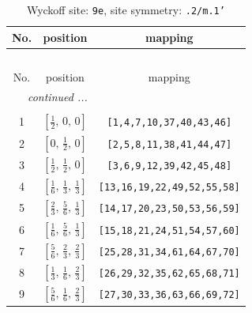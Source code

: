 \documentclass[fleqn,8pt]{jsarticle}
\begin{document}
\begin{longtable}{ccc}
\caption{Wyckoff site: {\tt 9e}, site symmetry: {\tt .2/m.1'}}
 \\
 \hline \hline
No. & position & mapping \\ \hline \endfirsthead

\multicolumn{2}{l}{\tablename\ \thetable{}} \\
 \hline \hline
No. & position & mapping \\ \hline \endhead

 \hline \hline
\multicolumn{2}{r}{\footnotesize\it continued ...} \\ \endfoot

 \hline \hline
\multicolumn{2}{r}{} \\ \endlastfoot

1 & $\left[ \frac{1}{2},\, 0,\, 0 \right]$ & {\tt [1,4,7,10,37,40,43,46]} \\ \hline
2 & $\left[ 0,\, \frac{1}{2},\, 0 \right]$ & {\tt [2,5,8,11,38,41,44,47]} \\ \hline
3 & $\left[ \frac{1}{2},\, \frac{1}{2},\, 0 \right]$ & {\tt [3,6,9,12,39,42,45,48]} \\ \hline
4 & $\left[ \frac{1}{6},\, \frac{1}{3},\, \frac{1}{3} \right]$ & {\tt [13,16,19,22,49,52,55,58]} \\ \hline
5 & $\left[ \frac{2}{3},\, \frac{5}{6},\, \frac{1}{3} \right]$ & {\tt [14,17,20,23,50,53,56,59]} \\ \hline
6 & $\left[ \frac{1}{6},\, \frac{5}{6},\, \frac{1}{3} \right]$ & {\tt [15,18,21,24,51,54,57,60]} \\ \hline
7 & $\left[ \frac{5}{6},\, \frac{2}{3},\, \frac{2}{3} \right]$ & {\tt [25,28,31,34,61,64,67,70]} \\ \hline
8 & $\left[ \frac{1}{3},\, \frac{1}{6},\, \frac{2}{3} \right]$ & {\tt [26,29,32,35,62,65,68,71]} \\ \hline
9 & $\left[ \frac{5}{6},\, \frac{1}{6},\, \frac{2}{3} \right]$ & {\tt [27,30,33,36,63,66,69,72]} \\
\end{longtable}
\renewcommand{\arraystretch}{1.2}
\end{document}
